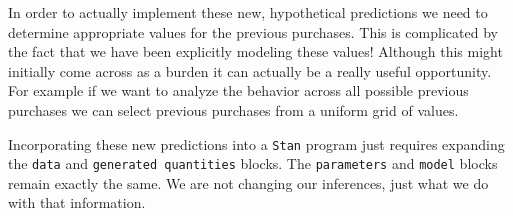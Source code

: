 \documentclass[
  letterpaper,
  DIV=11,
  numbers=noendperiod]{scrartcl}
\newenvironment{Shaded}{\begin{snugshade}}{\end{snugshade}}
\newcommand{\AttributeTok}[1]{\textcolor[rgb]{0.40,0.45,0.13}{#1}}
\newcommand{\DecValTok}[1]{\textcolor[rgb]{0.68,0.00,0.00}{#1}}
\newcommand{\FunctionTok}[1]{\textcolor[rgb]{0.28,0.35,0.67}{#1}}
\newcommand{\NormalTok}[1]{\textcolor[rgb]{0.00,0.23,0.31}{#1}}
\newcommand{\OtherTok}[1]{\textcolor[rgb]{0.00,0.23,0.31}{#1}}
\newcommand{\SpecialCharTok}[1]{\textcolor[rgb]{0.37,0.37,0.37}{#1}}
\begin{document}
In order to actually implement these new, hypothetical predictions we
need to determine appropriate values for the previous purchases. This is
complicated by the fact that we have been explicitly modeling these
values! Although this might initially come across as a burden it can
actually be a really useful opportunity. For example if we want to
analyze the behavior across all possible previous purchases we can
select previous purchases from a uniform grid of values.

\begin{Shaded}
\end{Shaded}

Incorporating these new predictions into a \texttt{Stan} program just
requires expanding the \texttt{data} and \texttt{generated\ quantities}
blocks. The \texttt{parameters} and \texttt{model} blocks remain exactly
the same. We are not changing our inferences, just what we do with that
information.
\end{document}
